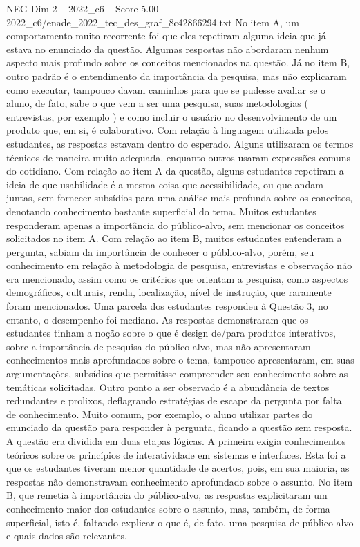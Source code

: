 \begin{textsample}{NEG Dim 2 – 2022\_c6 – Score 5.00 – 2022\_c6/enade\_2022\_tec\_des\_graf\_8c42866294.txt}
No item A, um comportamento muito recorrente foi que eles repetiram alguma ideia que já estava no enunciado da questão.
Algumas respostas não abordaram nenhum aspecto mais profundo sobre os conceitos mencionados na questão.
Já no item B, outro padrão é o entendimento da importância da pesquisa, mas não explicaram como executar, tampouco davam caminhos para que se pudesse avaliar se o aluno, de fato, sabe o que vem a ser uma pesquisa, suas metodologias ( entrevistas, por exemplo ) e como incluir o usuário no desenvolvimento de um produto que, em si, é colaborativo.
Com relação à linguagem utilizada pelos estudantes, as respostas estavam dentro do esperado.
Alguns utilizaram os termos técnicos de maneira muito adequada, enquanto outros usaram expressões comuns do cotidiano.
Com relação ao item A da questão, alguns estudantes repetiram a ideia de que usabilidade é a mesma coisa que acessibilidade, ou que andam juntas, sem fornecer subsídios para uma análise mais profunda sobre os conceitos, denotando conhecimento bastante superficial do tema.
Muitos estudantes responderam apenas a importância do público-alvo, sem mencionar os conceitos solicitados no item A.
Com relação ao item B, muitos estudantes entenderam a pergunta, sabiam da importância de conhecer o público-alvo, porém, seu conhecimento em relação à metodologia de pesquisa, entrevistas e observação não era mencionado, assim como os critérios que orientam a pesquisa, como aspectos demográficos, culturais, renda, localização, nível de instrução, que raramente foram mencionados.
Uma parcela dos estudantes respondeu à Questão 3, no entanto, o desempenho foi mediano.
As respostas demonstraram que os estudantes tinham a noção sobre o que é design de/para produtos interativos, sobre a importância de pesquisa do público-alvo, mas não apresentaram conhecimentos mais aprofundados sobre o tema, tampouco apresentaram, em suas argumentações, subsídios que permitisse compreender seu conhecimento sobre as temáticas solicitadas.
Outro ponto a ser observado é a abundância de textos redundantes e prolixos, deflagrando estratégias de escape da pergunta por falta de conhecimento.
Muito comum, por exemplo, o aluno utilizar partes do enunciado da questão para responder à pergunta, ficando a questão sem resposta.
A questão era dividida em duas etapas lógicas.
A primeira exigia conhecimentos teóricos sobre os princípios de interatividade em sistemas e interfaces.
Esta foi a que os estudantes tiveram menor quantidade de acertos, pois, em sua maioria, as respostas não demonstravam conhecimento aprofundado sobre o assunto.
No item B, que remetia à importância do público-alvo, as respostas explicitaram um conhecimento maior dos estudantes sobre o assunto, mas, também, de forma superficial, isto é, faltando explicar o que é, de fato, uma pesquisa de público-alvo e quais dados são relevantes.

\end{textsample}
